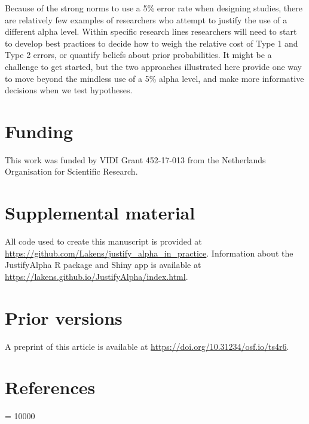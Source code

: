 \documentclass[
  english,
  ,man, a4paper,floatsintext]{apa6}
\begin{document}
Because of the strong norms to use a 5\% error rate when designing studies, there are relatively few examples of researchers who attempt to justify the use of a different alpha level. Within specific research lines researchers will need to start to develop best practices to decide how to weigh the relative cost of Type 1 and Type 2 errors, or quantify beliefs about prior probabilities. It might be a challenge to get started, but the two approaches illustrated here provide one way to move beyond the mindless use of a 5\% alpha level, and make more informative decisions when we test hypotheses.

\hypertarget{funding}{%
\section{Funding}\label{funding}}

This work was funded by VIDI Grant 452-17-013 from the Netherlands Organisation for Scientific Research.

\hypertarget{supplemental-material}{%
\section{Supplemental material}\label{supplemental-material}}

All code used to create this manuscript is provided at \url{https://github.com/Lakens/justify_alpha_in_practice}. Information about the JustifyAlpha R package and Shiny app is available at \url{https://lakens.github.io/JustifyAlpha/index.html}.

\hypertarget{prior-versions}{%
\section{Prior versions}\label{prior-versions}}

A preprint of this article is available at \url{https://doi.org/10.31234/osf.io/ts4r6}.

\newpage

\hypertarget{references}{%
\section{References}\label{references}}

\begingroup

\interlinepenalty = 10000
\end{document}
